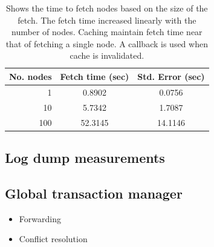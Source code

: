 \begin{table}
\label{tab:qrscans}
\begin{center}
  \begin{tabular}{| r | c  c | }
    \hline
    {\bf No. nodes } & {\bf Fetch time (sec) } & {\bf Std. Error (sec)} \\ \hline
    1 & 0.8902 & 0.0756 \\ \hline
    10 & 5.7342 & 1.7087 \\ \hline
    100 & 52.3145 & 14.1146 \\ 
    \hline
  \end{tabular}
\caption{Shows the time to fetch nodes based on the size of the fetch.  The fetch time
increased linearly with the number of nodes.  Caching maintain fetch time near
that of fetching a single node.  A callback is used when cache is invalidated.}
\end{center}
\end{table}

\subsection{Log dump measurements}


\subsection{Global transaction manager}
\begin{itemize}
\item Forwarding
\item Conflict resolution
\end{itemize}









